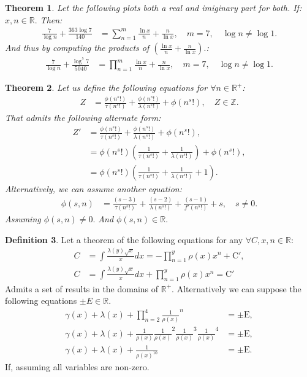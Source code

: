 \documentclass[10pt]{article}
\theoremstyle{plain}
\newtheorem{theorem}{Theorem}[section]
\theoremstyle{definition}
\newtheorem{definition}[theorem]{Definition}
\theoremstyle{remark}
\begin{document}
\begin{theorem}
	Let the following plots both a real and imiginary part for both. If: $x, n \in \mathbb{R}.$ Then:
	\begin{align*}
		\frac{7}{\log n} + \frac{363 \log 7}{140} &= \sum_{n=1}^{m} \frac{\ln x}{n} + \frac{n}{\ln x}, \quad m = 7, \quad \log n \neq \log 1.
	\end{align*}
	And thus by computing the products of $(\frac{\ln x}{n} + \frac{n}{\ln x}).$:
	\begin{align*}
		\frac{7}{\log n} + \frac{\log^{7} 7}{5040} &= \prod_{n=1}^{m} \frac{\ln x}{n} + \frac{n}{\ln x}, \quad m = 7, \quad \log n \neq \log 1.
	\end{align*}
\end{theorem}

\begin{theorem}
	Let us define the following equations for $\forall n \in \mathbb{R}^{+}$:
	\begin{align*}
		Z &= \frac{\phi(n^{s}!)}{\tau(n^{s}!)} + \frac{\phi(n^{s}!)}{\lambda(n^{s}!)} + \phi(n^{s}!), \quad Z \in \mathbb{Z}.
	\end{align*}
	That admits the following alternate form:
	\begin{align*}
		Z' &= \frac{\phi(n^{s}!)}{\tau(n^{s}!)} + \frac{\phi(n^{s}!)}{\lambda(n^{s}!)} + \phi(n^{s}!),\\
		&= \phi(n^{s}!)(\frac{1}{\tau(n^{s}!)} + \frac{1}{\lambda(n^{s}!)}) + \phi(n^{s}!),\\
		&= \phi(n^{s}!)(\frac{1}{\tau(n^{s}!)} + \frac{1}{\lambda(n^{s}!)} + 1).
	\end{align*}
	Alternatively, we can assume another equation:
	\begin{align*}
		\phi(s, n) &= \frac{(s-3)}{\tau(n^{s}!)} + \frac{(s-2)}{\lambda(n^{s}!)} + \frac{(s-1)}{f'(n^{s}!)} + s, \quad s \neq 0.
	\end{align*}
	Assuming $\phi(s, n) \neq 0.$ And $\phi(s, n) \in \mathbb{R}.$
\end{theorem}

\begin{definition}
	Let a theorem of the following equations for any $\forall C, x, n \in \mathbb{R}$:
	\begin{align*}
		C &= \int \frac{\lambda(y) \sqrt{x}}{x} dx = - \prod_{n=1}^{y}\rho(x) x^{n} + \mathrm{C}',\\
		C &= \int \frac{\lambda(y) \sqrt{x}}{x} dx + \prod_{n=1}^{y}\rho(x) x^{n} = \mathrm{C}'
	\end{align*}
	Admits a set of results in the domains of $\mathbb{R}^{+}$. Alternatively we can suppose the following equations $\pm E \in \mathbb{R}.$
	\begin{align*}
		\gamma(x)+\lambda(x) + \prod_{n=2}^{4}\frac{1}{\rho(x)}^{n} &= \pm \mathrm{E},\\
		\gamma(x)+\lambda(x) + \frac{1}{\rho(x)} \frac{1}{\rho(x)}^{2} \frac{1}{\rho(x)}^{3} \frac{1}{\rho(x)}^{4} &= \pm \mathrm{E},\\
		\gamma(x)+\lambda(x) + \frac{1}{\rho(x)^{10}} &= \pm \mathrm{E}.
	\end{align*}
	If, assuming all variables are non-zero.
\end{definition}
\end{document}
